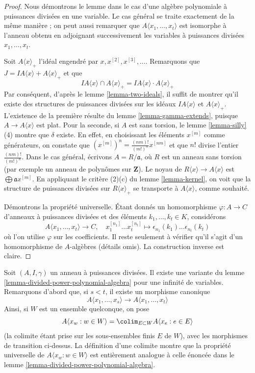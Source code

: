 \begin{proof}
Nous démontrons le lemme dans le cas d'une algèbre polynomiale à
puissances divisées en une variable. Le cas général se traite exactement de la même
manière ; on peut aussi remarquer que $A\langle x_1, \ldots, x_t\rangle$ est
isomorphe à l'anneau obtenu en adjoignant successivement les variables à puissances divisées
$x_1, \ldots, x_t$.

\medskip\noindent
Soit $A\langle x \rangle_{+}$ l'idéal engendré par
$x, x^{[2]}, x^{[3]}, \ldots$.
Remarquons que $J = IA\langle x \rangle + A\langle x \rangle_{+}$
et que
$$
IA\langle x \rangle\cap A\langle x \rangle_{+} =
IA\langle x \rangle\cdot A\langle x \rangle_{+}
$$
Par conséquent, d'après le lemme \ref{lemma-two-ideals}, il suffit de montrer qu'il existe
des structures de puissances divisées sur les idéaux $IA\langle x \rangle$ et
$A\langle x \rangle_{+}$. L'existence de la première résulte du
lemme \ref{lemma-gamma-extends}, puisque $A \to A\langle x \rangle$ est
plat. Pour la seconde, si $A$ est sans torsion, le
lemme \ref{lemma-silly} (4) montre que $\delta$ existe. En effet, en
choisissant les éléments $x^{[m]}$ comme générateurs, on constate que
$(x^{[m]})^n = \frac{(nm)!}{(m!)^n} x^{[nm]}$
et que $n!$ divise l'entier $\frac{(nm)!}{(m!)^n}$.
Dans le cas général, écrivons $A = R/\mathfrak a$, où $R$
est un anneau sans torsion (par exemple un anneau de polynômes sur $\mathbf{Z}$). Le noyau de
$R\langle x \rangle\to A\langle x \rangle$ est
$\bigoplus\mathfrak a x^{[m]}$. En appliquant le critère (2)(c) du
lemme \ref{lemma-kernel}, on voit que la structure de puissances divisées
sur $R\langle x \rangle_{+}$ se transporte à $A\langle x \rangle$,
comme souhaité.

\medskip\noindent
Démontrons la propriété universelle. Étant donnés un homomorphisme $\varphi : A \to C$
d'anneaux à puissances divisées et des éléments $k_1, \ldots, k_t \in K$, considérons
$$
A\langle x_1, \ldots, x_t \rangle\to C,\quad
x_1^{[n_1]} \ldots x_t^{[n_t]} \longmapsto
\epsilon_{n_1}(k_1) \ldots\epsilon_{n_t}(k_t)
$$
où l'on utilise $\varphi$ sur les coefficients. Il reste seulement à vérifier qu'il s'agit d'un
homomorphisme de $A$-algèbres (détails omis). La construction
inverse est claire.
\end{proof}

\begin{remark}
\label{remark-divided-power-polynomial-algebra}
Soit $(A, I, \gamma)$ un anneau à puissances
divisées. Il existe une variante du lemme \ref{lemma-divided-power-polynomial-algebra}
pour une infinité de variables. Remarquons d'abord que, si $s < t$, il existe
un morphisme canonique
$$
A\langle x_1, \ldots, x_s \rangle\to A\langle x_1, \ldots, x_t\rangle
$$
Ainsi, si $W$ est un ensemble quelconque, on pose
$$
A\langle x_w: w \in W\rangle =
\colim_{E \subset W} A\langle x_e:e \in E\rangle
$$
(la colimite étant prise sur les sous-ensembles finis $E$ de $W$),
avec les morphismes de transition ci-dessus. La définition d'une
colimite montre que la propriété universelle de $A\langle x_w: w \in W\rangle$ est
entièrement analogue à celle énoncée dans le
lemme \ref{lemma-divided-power-polynomial-algebra}.
\end{remark}

